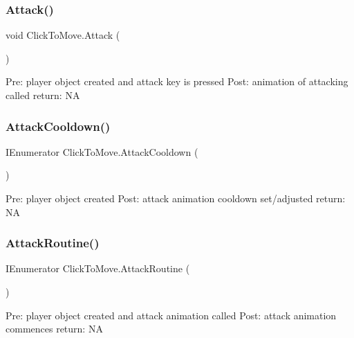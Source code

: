 \subsubsection{\texorpdfstring{Attack()}{Attack()}}
{\footnotesize\ttfamily void Click\+To\+Move.\+Attack (\begin{DoxyParamCaption}{ }\end{DoxyParamCaption})\hspace{0.3cm}{\ttfamily [private]}}

Pre\+: player object created and attack key is pressed Post\+: animation of attacking called return\+: NA \mbox{\label{class_click_to_move_a9ec6685677f20e880a600762dd64d22a}} 
\subsubsection{\texorpdfstring{Attack\+Cooldown()}{AttackCooldown()}}
{\footnotesize\ttfamily I\+Enumerator Click\+To\+Move.\+Attack\+Cooldown (\begin{DoxyParamCaption}{ }\end{DoxyParamCaption})\hspace{0.3cm}{\ttfamily [private]}}

Pre\+: player object created Post\+: attack animation cooldown set/adjusted return\+: NA \mbox{\label{class_click_to_move_a81c5db2ca3553c2bb0cd6473437a5561}} 
\subsubsection{\texorpdfstring{Attack\+Routine()}{AttackRoutine()}}
{\footnotesize\ttfamily I\+Enumerator Click\+To\+Move.\+Attack\+Routine (\begin{DoxyParamCaption}{ }\end{DoxyParamCaption})\hspace{0.3cm}{\ttfamily [private]}}

Pre\+: player object created and attack animation called Post\+: attack animation commences return\+: NA \mbox{\label{class_click_to_move_ad8ff402015f7fb9e9e850400ca47e47b}} 
